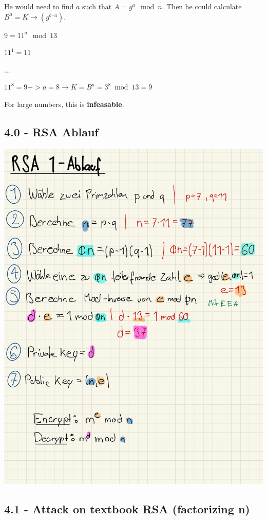 \documentclass[11pt]{article}
\begin{document}
He would need to find \(a\) such that \(A=g^a \mod n\). Then he could
calculate \(B^a=K \rightarrow(g^{b \cdot a})\).

\(9=11^a \mod 13\)

\(11^1 = 11\)

\(...\)

\(11^8 = 9 -> a=8 \rightarrow K = B^a = 3^8 \bmod 13 = 9\)

For large numbers, this is \textbf{infeasable}.

    \hypertarget{rsa-ablauf}{%
\subsection{4.0 - RSA Ablauf}\label{rsa-ablauf}}

\includegraphics{img/rsa_ablauf.jpg}

\newpage

    \hypertarget{attack-on-textbook-rsa-factorizing-n}{%
\subsection{4.1 - Attack on textbook RSA (factorizing
n)}\label{attack-on-textbook-rsa-factorizing-n}}
\end{document}
